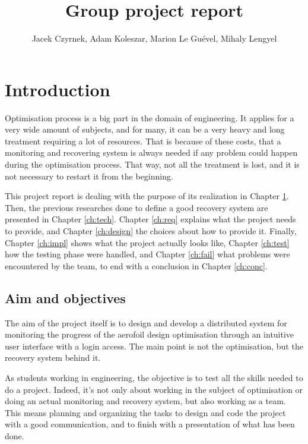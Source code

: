 \documentclass[10pt,a4paper]{report}
\author{Jacek Czyrnek, Adam Koleszar, Marion Le Guével, Mihaly Lengyel}
\title{Group project report}
\begin{document}
\maketitle
\tableofcontents

\chapter{Introduction}
\label{ch:intro}
Optimisation process is a big part in the domain of engineering. It applies for a very wide amount of subjects, and for many, it can be a very heavy and long treatment requiring a lot of resources. That is because of these costs, that a monitoring and recovering system is always needed if any problem could happen during the optimisation process. That way, not all the treatment is lost, and it is not necessary to restart it from the beginning.

This project report is dealing with the purpose of its realization in Chapter \ref{ch:intro}. Then, the previous researches done to define a good recovery system are presented in Chapter \ref{ch:tech}. Chapter \ref{ch:req} explains what the project needs to provide, and Chapter \ref{ch:design} the choices about how to provide it. Finally, Chapter \ref{ch:impl} shows what the project actually looks like, Chapter \ref{ch:test} how the testing phase were handled, and Chapter \ref{ch:fail} what problems were encountered by the team, to end with a conclusion in Chapter \ref{ch:conc}.

\section{Aim and objectives}
The aim of the project itself is to design and develop a distributed system for monitoring the progress of the aerofoil design optimisation through an intuitive user interface with a login access. The main point is not the optimisation, but the recovery system behind it.

As students working in engineering, the objective is to test all the skills needed to do a project. Indeed, it's not only about working in the subject of optimisation or doing an actual monitoring and recovery system, but also working as a team. This means planning and organizing the tasks to design and code the project with a good communication, and to finish with a presentation of what has been done.
	
\end{document}
